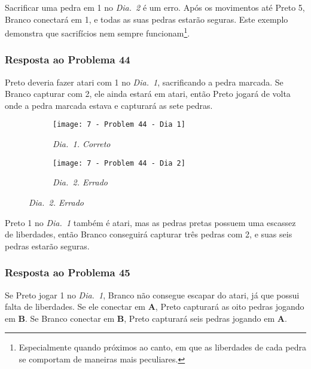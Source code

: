 Sacrificar uma pedra em 1 no \emph{Dia.\@~2} é um erro. Após os movimentos até Preto 5, Branco conectará em 1, e todas as suas pedras estarão seguras. Este exemplo demonstra que sacrifícios nem sempre funcionam\footnote{Especialmente quando próximos ao canto, em que as liberdades de cada pedra se comportam de maneiras mais peculiares.}.

\pagebreak

\subsubsection*{Resposta ao Problema 44}

Preto deveria fazer atari com 1 no \emph{Dia.\@~1}, sacrificando a pedra marcada. Se Branco capturar com 2, ele ainda estará em atari, então Preto jogará de volta onde a pedra marcada estava e capturará as sete pedras.
 
\begin{figure}[h!]
    \centering
    \begin{subfigure}[t]{.425\textwidth}
        \texttt{[image: 7 - Problem 44 - Dia 1]}
        \captionsetup{justification=centering}
        \caption*{\emph{Dia.\@~1. Correto}}
    \end{subfigure}
    \hspace{1cm}
    \begin{subfigure}[t]{.425\textwidth}
        \texttt{[image: 7 - Problem 44 - Dia 2]}
        \captionsetup{justification=centering}
        \caption*{\emph{Dia.\@~2. Errado}}
    \end{subfigure}
\end{figure}

Preto 1 no \emph{Dia.\@~1} também é atari, mas as pedras pretas possuem uma escassez de liberdades, então Branco conseguirá capturar três pedras com 2, e suas seis pedras estarão seguras.

\pagebreak

\subsubsection*{Resposta ao Problema 45}

Se Preto jogar 1 no \emph{Dia.\@~1}, Branco não consegue escapar do atari, já que possui falta de liberdades. Se ele conectar em \textbf{A}, Preto capturará as oito pedras jogando em \textbf{B}. Se Branco conectar em \textbf{B}, Preto capturará seis pedras jogando em \textbf{A}.
 
